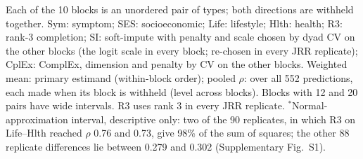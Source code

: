 \documentclass[journal]{IEEEtran}
\begin{document}
\begin{table}[!t]
\smallskip
\parbox{\columnwidth}{\footnotesize Each of the 10 blocks is an unordered pair of types; both directions are withheld together. Sym: symptom; SES: socioeconomic; Life: lifestyle; Hlth: health; R3: rank-3 completion; SI: soft-impute with penalty and scale chosen by dyad CV on the other blocks (the logit scale in every block; re-chosen in every JRR replicate); CplEx: ComplEx, dimension and penalty by CV on the other blocks. Weighted mean: primary estimand (within-block order); pooled $\rho$: over all 552 predictions, each made when its block is withheld (level across blocks). Blocks with 12 and 20 pairs have wide intervals. R3 uses rank 3 in every JRR replicate. $^{\ast}$Normal-approximation interval, descriptive only: two of the 90 replicates, in which R3 on Life--Hlth reached $\rho$ 0.76 and 0.73, give 98\% of the sum of squares; the other 88 replicate differences lie between 0.279 and 0.302 (Supplementary Fig.~S1).}
\end{table}
\end{document}
